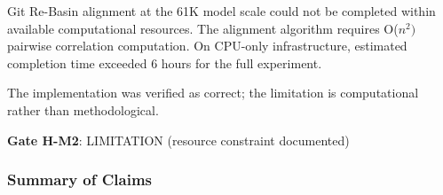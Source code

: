 Git Re-Basin alignment at the 61K model scale could not be completed within available computational resources. The alignment algorithm requires O($n^{2})$ pairwise correlation computation. On CPU-only infrastructure, estimated completion time exceeded 6 hours for the full experiment.

The implementation was verified as correct; the limitation is computational rather than methodological.

\textbf{Gate H-M2}: LIMITATION (resource constraint documented)

\subsubsection{Summary of Claims}

\begin{table}[htbp]
\centering
{}
\end{table}
